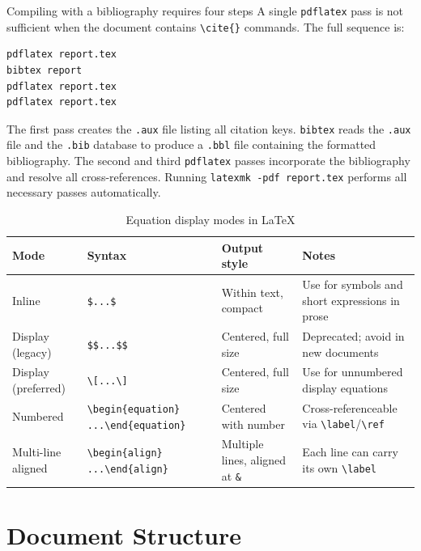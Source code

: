 \begin{warningbox}{Compiling with a bibliography requires four steps}
A single \texttt{pdflatex} pass is not sufficient when the document
contains \verb|\cite{}| commands. The full sequence is:

\begin{verbatim}
pdflatex report.tex
bibtex report
pdflatex report.tex
pdflatex report.tex
\end{verbatim}

The first pass creates the \texttt{.aux} file listing all citation
keys. \texttt{bibtex} reads the \texttt{.aux} file and the
\texttt{.bib} database to produce a \texttt{.bbl} file containing
the formatted bibliography. The second and third \texttt{pdflatex}
passes incorporate the bibliography and resolve all
cross-references. Running \texttt{latexmk -pdf report.tex} performs
all necessary passes automatically.
\end{warningbox}

\begin{table}[htbp]
\centering
\caption{Equation display modes in \LaTeX{}}
\label{tab:equation-modes}
\begin{tabular}{p{2.8cm} p{4.2cm} p{2.5cm} p{4.5cm}}
\toprule
\textbf{Mode} & \textbf{Syntax} & \textbf{Output style} & \textbf{Notes} \\
\midrule
Inline & \verb|$...$| & Within text, compact & Use for symbols and short expressions in prose \\
Display (legacy) & \verb|$$...$$| & Centered, full size & Deprecated; avoid in new documents \\
Display (preferred) & \verb|\[...\]| & Centered, full size & Use for unnumbered display equations \\
Numbered & \verb|\begin{equation}| \verb|...\end{equation}| & Centered with number & Cross-referenceable via \verb|\label|/\verb|\ref| \\
Multi-line aligned & \verb|\begin{align}| \verb|...\end{align}| & Multiple lines, aligned at \verb|&| & Each line can carry its own \verb|\label| \\
\bottomrule
\end{tabular}
\end{table}

\section{Document Structure}
\label{sec:latex-structure}

